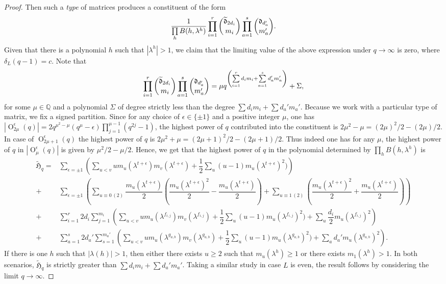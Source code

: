 \documentclass[11pt,twoside]{amsart}
\renewcommand{\d}{\mathfrak d}
\newcommand{\Or}{\operatorname{O}}
\theoremstyle{definition} %
\begin{document}
\begin{proof}
    Then such a \emph{type} of matrices produces a constituent of the form
    \begin{align*}\label{eq:symp}
        \dfrac{1}{\prod\limits_{h}B(h,\lambda^h)}\prod\limits_{i=1}^r\dbinom{\widetilde{\d}_{2d_i}}{m_i}\prod\limits_{a=1}^s\dbinom{\d_{d_a'}}{m_a'}.
    \end{align*}
    Given that there is a polynomial $h$ such that $|\lambda^h|>1$, we claim that the limiting value of the above expression under $q\longrightarrow \infty$ is zero, where $\delta_L(q-1)=c$. Note that
    \begin{align*}
        \prod\limits_{i=1}^r\dbinom{\widetilde{\d}_{2d_i}}{m_i}\prod\limits_{a=1}^s\dbinom{\d_{d_a'}}{m_a'}=\mu q^{\left(\sum\limits_{i=1}^rd_im_i+\sum\limits_{a=1}^sd_a'm_a'\right)} + \Sigma,
    \end{align*}
    for some $\mu\in\mathbb Q$ and a polynomial $\Sigma$ of degree strictly less than the degree $\sum d_im_i+\sum d_a'm_a'$.
    Because we work with a particular type of matrix, we fix a signed partition. 
    Since for any choice of $\epsilon\in\{\pm 1\}$ and a positive integer $\mu$, one has $|\Or^\epsilon_{2\mu}(q)|=2q^{\mu^2-\mu}(q^\mu-\epsilon)\prod\limits_{j=1}^{\mu-1}(q^{2j}-1)$, the highest power of $q$ contributed into the constituent is $2\mu^2-\mu=(2\mu)^2/2-(2\mu)/2$.
    In case of $\Or^\epsilon_{2\mu+1}(q)$ the highest power of $q$ is $2\mu^2+\mu=(2\mu+1)^2/2-(2\mu+1)/2$.
    Thus indeed one has for any $\mu$, the highest power of $q$ in $|\Or^\epsilon_\mu(q)|$ is given by $\mu^2/2-\mu/2$.
    Hence, we get that the highest power of $q$ in the polynomial determined by $\prod\limits_{h}B(h,\lambda^h)$ is
    \begin{align*}
\widetilde{\mathfrak H}_q=&\sum\limits_{\epsilon=\pm 1}\left(\sum\limits_{u<v}um_u(\lambda^{t+\epsilon})m_v(\lambda^{t+\epsilon})+\dfrac{1}{2}\sum\limits_{u}(u-1)m_u(\lambda^{t+\epsilon})^2)\right)\\
+&\sum\limits_{\epsilon=\pm 1}\left(\sum\limits_{u\equiv 0\,(2)}\dfrac{m_u(\lambda^{t+\epsilon})}{2}\left(\dfrac{m_u(\lambda^{t+\epsilon})^2}{2}-\dfrac{m_u(\lambda^{t+\epsilon})}{2}\right)+\sum\limits_{u\equiv 1\,(2)}\left(\dfrac{m_u(\lambda^{t+\epsilon})^2}{2}+\dfrac{m_u(\lambda^{t+\epsilon})}{2}\right)\right)\\
+&\sum\limits_{i=1}^r 2d_i\sum\limits_{j=1}^{m_i}\left(\sum\limits_{u<v}um_u(\lambda^{f_{i,j}})m_v(\lambda^{f_{i,j}})+\dfrac{1}{2}\sum\limits_{u}(u-1)m_u(\lambda^{f_{i,j}})^2)+\sum\limits_{u}\dfrac{d_i}{2}m_u(\lambda^{f_{i,j}})^2\right)\\
+&\sum\limits_{a=1}^{s}2d_a'\sum\limits_{s=1}^{m_a'}\left(\sum\limits_{u<v}um_u(\lambda^{g_{a,b}})m_v(\lambda^{g_{a,b}})+\dfrac{1}{2}\sum\limits_{u}(u-1)m_u(\lambda^{g_{a,b}})^2)+\sum\limits_{a}d_a'm_u(\lambda^{g_{a,b}})^2\right).
\end{align*}
If there is one $h$ such that $|\lambda(h)|>1$, then either there exists $u\geq 2$ such that $m_u(\lambda^h)\geq 1$ or there exists $m_1(\lambda^h)>1$.
In both scenarios, $\widetilde{\mathfrak H}_q$ is strictly greater than $\sum d_im_i+\sum d_a'm_a'$.
Taking a similar study in case $L$ is even, the result follows by considering the limit $q\longrightarrow\infty$.
\end{proof}
\end{document}

